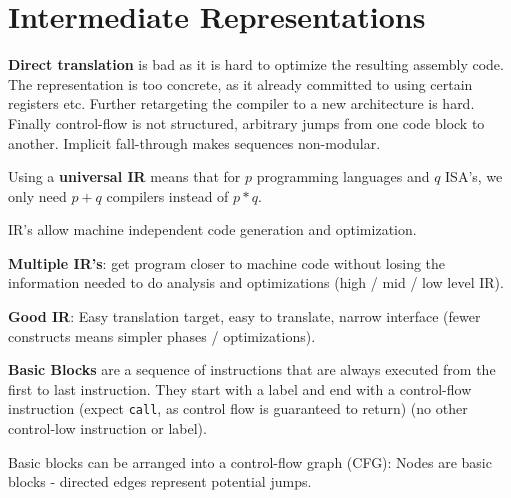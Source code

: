 \section*{Intermediate Representations}

\textbf{Direct translation} is bad as it is hard to optimize the resulting assembly code. The representation is too concrete, as it already committed to using certain registers etc. Further retargeting the compiler to a new architecture is hard. Finally control-flow is not structured, arbitrary jumps from one code block to another. Implicit fall-through makes sequences non-modular. \medskip

Using a \textbf{universal IR} means that for $p$ programming languages and $q$ ISA's, we only need $p + q$ compilers instead of $p * q$. \medskip

IR's allow machine independent code generation and optimization.\medskip
	
\textbf{Multiple IR's}: get program closer to machine code without losing the information needed to do analysis and optimizations (high / mid / low level IR).\medskip
		
\textbf{Good IR}: Easy translation target, easy to translate, narrow interface (fewer constructs means simpler phases / optimizations).\medskip
	
\textbf{Basic Blocks} are a sequence of instructions that are always executed from the first to last instruction. They start with a label and end with a control-flow instruction (expect \texttt{call}, as control flow is guaranteed to return) (no other control-low instruction or label).\medskip
	
Basic blocks can be arranged into a control-flow graph (CFG): Nodes are basic blocks - directed edges represent potential jumps.
